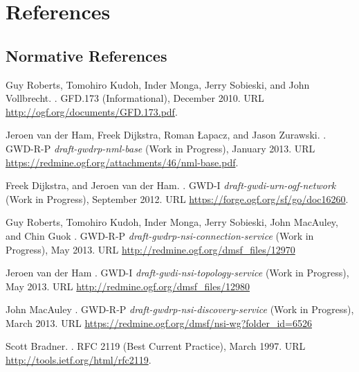 %
\section*{References}%
\label{s:references}
% 
\renewcommand{\refname}{}

\subsection*{Normative References}
\begin{thebibliography}{10}
\vspace*{-3em}
Guy Roberts, Tomohiro Kudoh, Inder Monga, Jerry Sobieski, and John Vollbrecht.
.
\newblock GFD.173 (Informational), December 2010.
\newblock URL \url{http://ogf.org/documents/GFD.173.pdf}.

Jeroen van der Ham, Freek Dijkstra, Roman Łapacz, and Jason Zurawski.
.
\newblock GWD-R-P \emph{draft-gwdrp-nml-base} (Work in Progress), January 2013.
\newblock URL \url{https://redmine.ogf.org/attachments/46/nml-base.pdf}.

Freek Dijkstra, and Jeroen van der Ham.
.
\newblock GWD-I \emph{draft-gwdi-urn-ogf-network} (Work in Progress), September 2012.
\newblock URL \url{https://forge.ogf.org/sf/go/doc16260}.

Guy Roberts, Tomohiro Kudoh, Inder Monga, Jerry Sobieski, John MacAuley, and Chin Guok
.
\newblock GWD-R-P \emph{draft-gwdrp-nsi-connection-service} (Work in Progress), May 2013.
\newblock URL \url{http://redmine.ogf.org/dmsf_files/12970}

Jeroen van der Ham
.
\newblock GWD-I \emph{draft-gwdi-nsi-topology-service} (Work in Progress), May 2013.
\newblock URL \url{http://redmine.ogf.org/dmsf_files/12980}

John MacAuley
.
\newblock GWD-R-P \emph{draft-gwdrp-nsi-discovery-service} (Work in Progress), March 2013.
\newblock URL \url{https://redmine.ogf.org/dmsf/nsi-wg?folder_id=6526} %

Scott Bradner.
.
\newblock RFC 2119 (Best Current Practice), March 1997.
\newblock URL \url{http://tools.ietf.org/html/rfc2119}.

\end{thebibliography}

